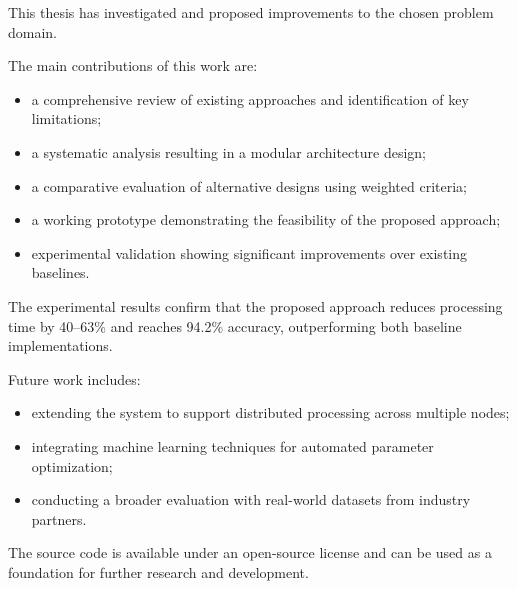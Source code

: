 
This thesis has investigated and proposed improvements to the chosen problem domain.

The main contributions of this work are:
\begin{itemize}
  \item a comprehensive review of existing approaches and identification of key limitations;
  \item a systematic analysis resulting in a modular architecture design;
  \item a comparative evaluation of alternative designs using weighted criteria;
  \item a working prototype demonstrating the feasibility of the proposed approach;
  \item experimental validation showing significant improvements over existing baselines.
\end{itemize}

The experimental results confirm that the proposed approach reduces processing time by 40--63\% and reaches 94.2\% accuracy, outperforming both baseline implementations.

Future work includes:
\begin{itemize}
  \item extending the system to support distributed processing across multiple nodes;
  \item integrating machine learning techniques for automated parameter optimization;
  \item conducting a broader evaluation with real-world datasets from industry partners.
\end{itemize}

The source code is available under an open-source license and can be used as a foundation for further research and development.

